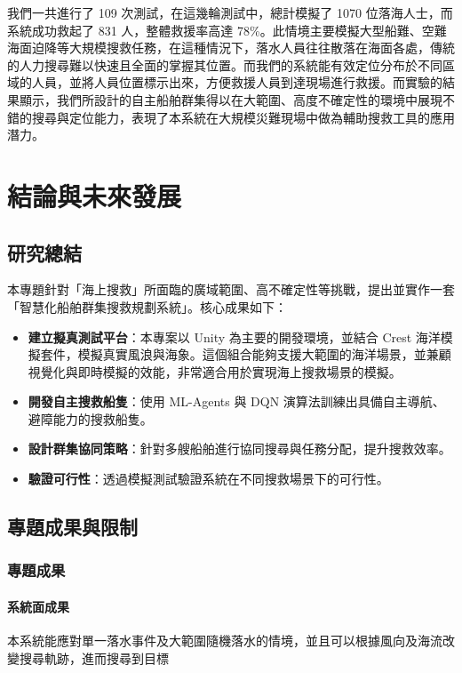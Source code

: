 \documentclass[12pt,a4paper]{article}
\begin{document}
我們一共進行了 109 次測試，在這幾輪測試中，總計模擬了 1070 位落海人士，而系統成功救起了 831 人，整體救援率高達 78\%。此情境主要模擬大型船難、空難海面迫降等大規模搜救任務，在這種情況下，落水人員往往散落在海面各處，傳統的人力搜尋難以快速且全面的掌握其位置。而我們的系統能有效定位分布於不同區域的人員，並將人員位置標示出來，方便救援人員到達現場進行救援。而實驗的結果顯示，我們所設計的自主船舶群集得以在大範圍、高度不確定性的環境中展現不錯的搜尋與定位能力，表現了本系統在大規模災難現場中做為輔助搜救工具的應用潛力。

\newpage

\section{結論與未來發展}

\subsection{研究總結}
本專題針對「海上搜救」所面臨的廣域範圍、高不確定性等挑戰，提出並實作一套「智慧化船舶群集搜救規劃系統」。核心成果如下：
\begin{itemize}
	\item \textbf{建立擬真測試平台}：本專案以 Unity 為主要的開發環境，並結合 Crest 海洋模擬套件，模擬真實風浪與海象。這個組合能夠支援大範圍的海洋場景，並兼顧視覺化與即時模擬的效能，非常適合用於實現海上搜救場景的模擬。
	\item \textbf{開發自主搜救船隻}：使用 ML-Agents 與 DQN 演算法訓練出具備自主導航、避障能力的搜救船隻。
	\item \textbf{設計群集協同策略}：針對多艘船舶進行協同搜尋與任務分配，提升搜救效率。
	\item \textbf{驗證可行性}：透過模擬測試驗證系統在不同搜救場景下的可行性。
\end{itemize}

\subsection{專題成果與限制}
\subsubsection{專題成果}
\paragraph{系統面成果} 本系統能應對單一落水事件及大範圍隨機落水的情境，並且可以根據風向及海流改變搜尋軌跡，進而搜尋到目標
\end{document}
